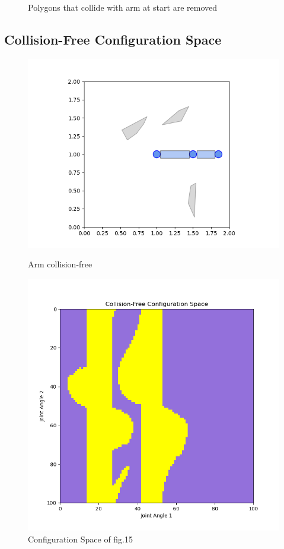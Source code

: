 \documentclass{article}
\begin{document}
\begin{figure}[H]
\begin{minipage}{0.45\textwidth}
  \end{minipage}
    \caption{Polygons that collide with arm at start are removed}
\end{figure}

\subsection{Collision-Free Configuration Space}
\begin{figure}[htbp]
  \centering
  \begin{minipage}{0.45\textwidth}
    \includegraphics[width=\linewidth]{part4_arm_free.png}
    \caption{Arm collision-free}
  \end{minipage}\hfill
  \begin{minipage}{0.45\textwidth}
    \includegraphics[width=\linewidth]{part4_cspace.png}
    \caption{Configuration Space of fig.15}
  \end{minipage}\hfill
\end{figure}
\end{document}
